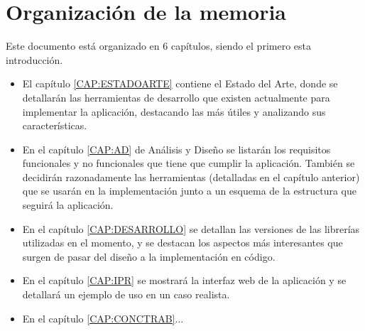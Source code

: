   \section{Organización de la memoria\label{SEC:ORGANIZACION}}
    Este documento está organizado en 6 capítulos, siendo el primero esta introducción. 
    \begin{itemize}
      \item El capítulo \ref{CAP:ESTADOARTE} contiene el Estado del Arte, donde se detallarán las herramientas de desarrollo que existen actualmente para implementar la aplicación, destacando las más útiles y analizando sus características.
      \item En el capítulo \ref{CAP:AD} de Análisis y Diseño se listarán los requisitos funcionales y no funcionales que tiene que cumplir la aplicación. También se decidirán razonadamente las herramientas (detalladas en el capítulo anterior) que se usarán en la implementación junto a un esquema de la estructura que seguirá la aplicación.
      \item En el capítulo \ref{CAP:DESARROLLO} se detallan las versiones de las librerías utilizadas en el momento, y se destacan los aspectos más interesantes que surgen de pasar del diseño a la implementación en código.
      \item En el capítulo \ref{CAP:IPR} se mostrará la interfaz web de la aplicación y se detallará un ejemplo de uso en un caso realista.
      \item En el capítulo \ref{CAP:CONCTRAB}...
    \end{itemize}
    
    
